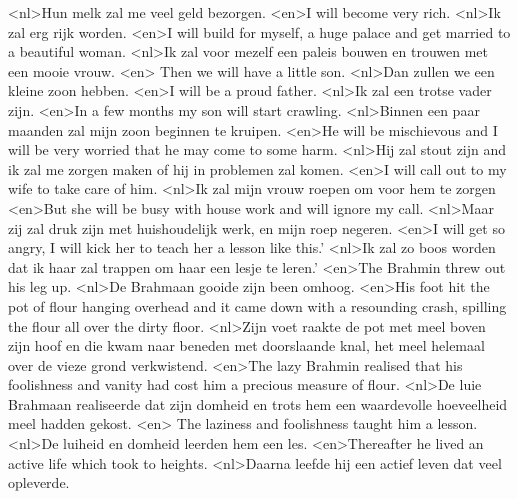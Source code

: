 <nl>Hun melk zal me veel geld bezorgen.
<en>I will become very rich. 
<nl>Ik zal erg rijk worden.
<en>I will build for myself, a huge palace and get married to a beautiful woman.
<nl>Ik zal voor mezelf een paleis bouwen en trouwen met een mooie vrouw.
<en> Then we will have a little son. 
<nl>Dan zullen we een kleine zoon hebben.
<en>I will be a proud father. 
<nl>Ik zal een trotse vader zijn.
<en>In a few months my son will start crawling. 
<nl>Binnen een paar maanden zal mijn zoon beginnen te kruipen.
<en>He will be mischievous and I will be very worried that he may come to some harm. 
<nl>Hij zal stout zijn and ik zal me zorgen maken of hij in problemen zal komen.
<en>I will call out to my wife to take care of him. 
<nl>Ik zal mijn vrouw roepen om voor hem te zorgen
<en>But she will be busy with house work and will ignore my call. 
<nl>Maar zij zal druk zijn met huishoudelijk werk, en mijn roep negeren.
<en>I will get so angry, I will kick her to teach her a lesson like this.'
<nl>Ik zal zo boos worden dat ik haar zal trappen om haar een lesje te leren.'
<en>The Brahmin threw out his leg up. 
<nl>De Brahmaan gooide zijn been omhoog.
<en>His foot hit the pot of flour hanging overhead and it came down with a resounding crash, spilling the flour all over the dirty floor. 
<nl>Zijn voet raakte de pot met meel boven zijn hoof en die kwam naar beneden met doorslaande knal, het meel helemaal over de vieze grond verkwistend.
<en>The lazy Brahmin realised that his foolishness and vanity had cost him a precious measure of flour.
<nl>De luie Brahmaan realiseerde dat zijn domheid en trots hem een waardevolle hoeveelheid meel hadden gekost.
<en> The laziness and foolishness taught him a lesson. 
<nl>De luiheid en domheid leerden hem een les.
<en>Thereafter he lived an active life which took to heights. 
<nl>Daarna leefde hij een actief leven dat veel opleverde.
